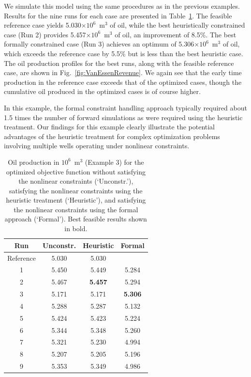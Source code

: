 \documentclass[twocolumn,numbook]{svjour3}          %
\begin{document}
We simulate this model using the same procedures as in the previous examples.
Results for the nine runs for each case are presented in
Table~\ref{table:vanessen}. The feasible reference case yields 5.030$\times 10^6$~m$^3$ of
oil, while the best heuristically constrained case (Run 2) provides 5.457$\times 10^6$~m$^3$
of oil, an improvement of 8.5\%. The best formally constrained case (Run 3)
achieves an optimum of 5.306$\times 10^6$~m$^3$ of oil, which exceeds the reference case by
5.5\% but is less than the best heuristic case. The oil production profiles
for the best runs, along with the feasible reference case, are shown in
Fig.~\ref{fig:VanEssenRevenue}. We again see that the early time production in
the reference case exceeds that of the optimized cases, though the cumulative
oil produced in the optimized cases is of course higher. 

In this example, the formal constraint handling approach typically required about 1.5 times the
number of forward simulations as were required using the heuristic treatment.
Our findings for this example clearly illustrate the potential
advantages of the heuristic treatment for complex optimization problems involving multiple wells
operating under nonlinear constraints.




\begin{table}
\centering
\caption{Oil production in $10^6$~m$^3$ (Example 3) for the optimized objective function
         without satisfying the nonlinear constraints (`Unconstr.'), satisfying the nonlinear constraints
         using the heuristic treatment (`Heuristic'), and satisfying the nonlinear constraints
         using the formal approach (`Formal'). Best feasible results shown in bold.}
\begin{tabular}{|c|c|c|c|}
\hline
 Run              & Unconstr. & Heuristic & Formal     \\
\hline
Reference         & 5.030 &  5.030    &          \\
1 & 5.450 &  5.449   &  5.284   \\
2 & 5.467 &\bf{5.457} &  5.294   \\
3 & 5.171 &  5.171   &\bf{5.306}\\
4 & 5.288 &  5.287   &  5.132   \\
5 & 5.424 &  5.423   &  5.224   \\
6 & 5.344 &  5.348   &  5.260   \\
7 & 5.321 &  5.230   &  4.994   \\
8 & 5.207 &  5.205   &  5.196   \\
9 & 5.353 &  5.349   &  4.986   \\
\hline
\end{tabular}
  \label{table:vanessen}
\end{table}
\end{document}
